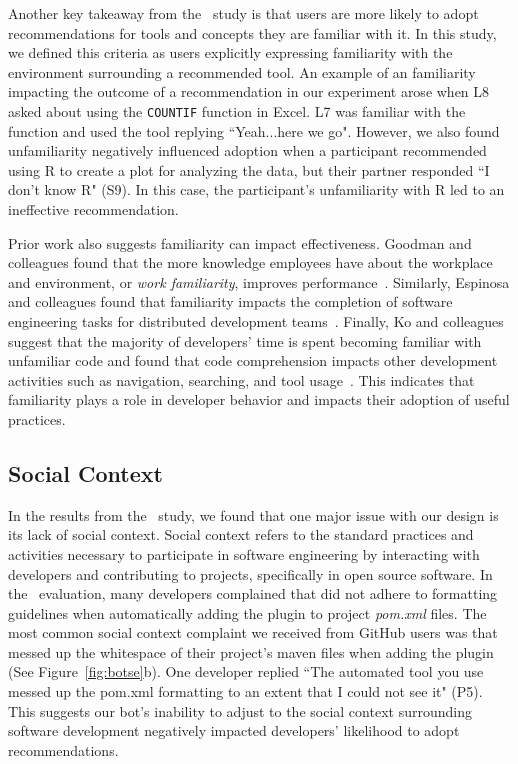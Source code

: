 Another key takeaway from the \peer~study is that users are more likely to adopt recommendations for tools and concepts they are familiar with it. In this study, we defined this criteria as users explicitly expressing familiarity with the environment surrounding a recommended tool. An example of an familiarity impacting the outcome of a recommendation in our experiment arose when L8 asked about using the \texttt{COUNTIF} function in Excel. L7 was familiar with the function and used the tool replying ``Yeah...here we go". However, we also found unfamiliarity negatively influenced adoption when a participant recommended using R to create a plot for analyzing the data, but their partner responded ``I don’t know R" (S9). In this case, the participant's unfamiliarity with R led to an ineffective recommendation. 

Prior work also suggests familiarity can impact effectiveness. Goodman and colleagues found that the more knowledge employees have about the workplace and environment, or \textit{work familiarity}, improves performance~\cite{goodman1992familiarity}. Similarly, Espinosa and colleagues found that familiarity impacts the completion of software engineering tasks for distributed development teams~\cite{espinosa2002shared}. Finally, Ko and colleagues suggest that the majority of developers' time is spent becoming familiar with unfamiliar code and found that code comprehension impacts other development activities such as navigation, searching, and tool usage~\cite{ko2006exploratory}. This indicates that familiarity plays a role in developer behavior and impacts their adoption of useful practices.


\subsection{Social Context}

In the results from the \sorry~study, we found that one major issue with our \tele design is its lack of social context. Social context refers to the standard practices and activities necessary to participate in software engineering by interacting with developers and contributing to projects, specifically in open source software. In the \sorry~evaluation, many developers complained that \tool did not adhere to formatting guidelines when automatically adding the \EP plugin to project \textit{pom.xml} files. The most common social context complaint we received from GitHub users was that \tool messed up the whitespace of their project's maven \pom files when adding the \EP plugin (See Figure~\ref{fig:botse}b). One developer replied ``The automated tool you use messed up the pom.xml formatting to an extent that I could not see it" (P5). This suggests our bot's inability to adjust to the social context surrounding software development negatively impacted developers' likelihood to adopt recommendations.

